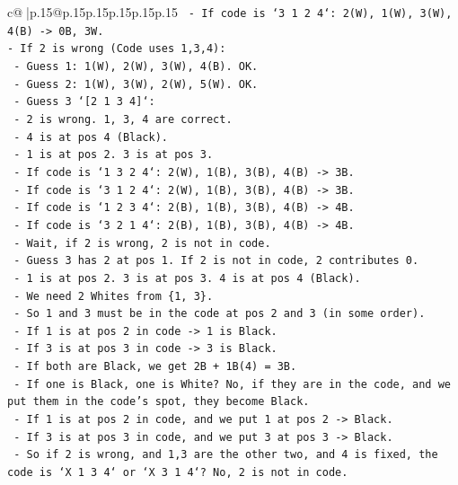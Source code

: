 \documentclass{article}
\begin{document}
{\begin{supertabular}{c@{$\;$}|p{.15\linewidth}@{}p{.15\linewidth}p{.15\linewidth}p{.15\linewidth}p{.15\linewidth}p{.15\linewidth}}
{{{\texttt{    {-} If code is `3 1 2 4`: 2(W), 1(W), 3(W), 4(B) {-}> 0B, 3W.} \\
\texttt{{-} If 2 is wrong (Code uses 1,3,4):} \\
\texttt{  {-} Guess 1: 1(W), 2(W), 3(W), 4(B). OK.} \\
\texttt{  {-} Guess 2: 1(W), 3(W), 2(W), 5(W). OK.} \\
\texttt{  {-} Guess 3 `{[}2 1 3 4{]}`:} \\
\texttt{    {-} 2 is wrong. 1, 3, 4 are correct.} \\
\texttt{    {-} 4 is at pos 4 (Black).} \\
\texttt{    {-} 1 is at pos 2. 3 is at pos 3.} \\
\texttt{    {-} If code is `1 3 2 4`: 2(W), 1(B), 3(B), 4(B) {-}> 3B.} \\
\texttt{    {-} If code is `3 1 2 4`: 2(W), 1(B), 3(B), 4(B) {-}> 3B.} \\
\texttt{    {-} If code is `1 2 3 4`: 2(B), 1(B), 3(B), 4(B) {-}> 4B.} \\
\texttt{    {-} If code is `3 2 1 4`: 2(B), 1(B), 3(B), 4(B) {-}> 4B.} \\
\texttt{    {-} Wait, if 2 is wrong, 2 is not in code.} \\
\texttt{    {-} Guess 3 has 2 at pos 1. If 2 is not in code, 2 contributes 0.} \\
\texttt{    {-} 1 is at pos 2. 3 is at pos 3. 4 is at pos 4 (Black).} \\
\texttt{    {-} We need 2 Whites from \{1, 3\}.} \\
\texttt{    {-} So 1 and 3 must be in the code at pos 2 and 3 (in some order).} \\
\texttt{    {-} If 1 is at pos 2 in code {-}> 1 is Black.} \\
\texttt{    {-} If 3 is at pos 3 in code {-}> 3 is Black.} \\
\texttt{    {-} If both are Black, we get 2B + 1B(4) = 3B.} \\
\texttt{    {-} If one is Black, one is White? No, if they are in the code, and we put them in the code's spot, they become Black.} \\
\texttt{    {-} If 1 is at pos 2 in code, and we put 1 at pos 2 {-}> Black.} \\
\texttt{    {-} If 3 is at pos 3 in code, and we put 3 at pos 3 {-}> Black.} \\
\texttt{    {-} So if 2 is wrong, and 1,3 are the other two, and 4 is fixed, the code is `X 1 3 4` or `X 3 1 4`? No, 2 is not in code.} \\
}}}
\end{supertabular}}
\end{document}
